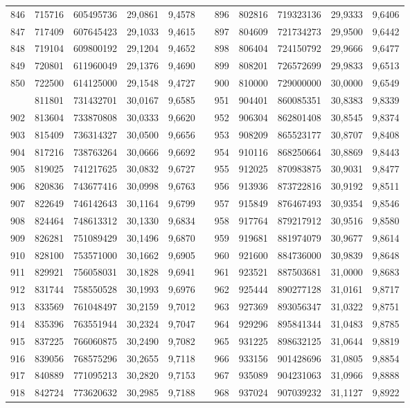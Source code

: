 \begin{longtable}{rrrrrrrrrrr}
846&715716&605495736&29,0861&9,4578&&896&802816&719323136&29,9333&9,6406\\
847&717409&607645423&29,1033&9,4615&&897&804609&721734273&29,9500&9,6442\\
848&719104&609800192&29,1204&9,4652&&898&806404&724150792&29,9666&9,6477\\
849&720801&611960049&29,1376&9,4690&&899&808201&726572699&29,9833&9,6513\\
850&722500&614125000&29,1548&9,4727&&900&810000&729000000&30,0000&9,6549\\
\newpage
901&811801&731432701&30,0167&9,6585&&951&904401&860085351&30,8383&9,8339\\
902&813604&733870808&30,0333&9,6620&&952&906304&862801408&30,8545&9,8374\\
903&815409&736314327&30,0500&9,6656&&953&908209&865523177&30,8707&9,8408\\
904&817216&738763264&30,0666&9,6692&&954&910116&868250664&30,8869&9,8443\\
905&819025&741217625&30,0832&9,6727&&955&912025&870983875&30,9031&9,8477\\
906&820836&743677416&30,0998&9,6763&&956&913936&873722816&30,9192&9,8511\\
907&822649&746142643&30,1164&9,6799&&957&915849&876467493&30,9354&9,8546\\
908&824464&748613312&30,1330&9,6834&&958&917764&879217912&30,9516&9,8580\\
909&826281&751089429&30,1496&9,6870&&959&919681&881974079&30,9677&9,8614\\
910&828100&753571000&30,1662&9,6905&&960&921600&884736000&30,9839&9,8648\\
911&829921&756058031&30,1828&9,6941&&961&923521&887503681&31,0000&9,8683\\
912&831744&758550528&30,1993&9,6976&&962&925444&890277128&31,0161&9,8717\\
913&833569&761048497&30,2159&9,7012&&963&927369&893056347&31,0322&9,8751\\
914&835396&763551944&30,2324&9,7047&&964&929296&895841344&31,0483&9,8785\\
915&837225&766060875&30,2490&9,7082&&965&931225&898632125&31,0644&9,8819\\
916&839056&768575296&30,2655&9,7118&&966&933156&901428696&31,0805&9,8854\\
917&840889&771095213&30,2820&9,7153&&967&935089&904231063&31,0966&9,8888\\
918&842724&773620632&30,2985&9,7188&&968&937024&907039232&31,1127&9,8922\\

\end{longtable}
